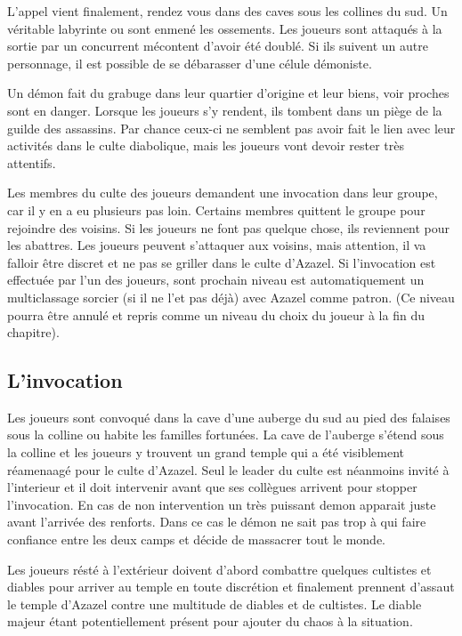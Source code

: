 L'appel vient finalement, rendez vous dans des caves sous les collines du sud.
Un véritable labyrinte ou sont enmené les ossements. Les joueurs sont attaqués
à la sortie par un concurrent mécontent d'avoir été doublé. Si ils suivent un 
autre personnage, il est possible de se débarasser d'une célule démoniste.

Un démon fait du grabuge dans leur quartier d'origine et 
leur biens, voir proches sont en danger. Lorsque les joueurs s'y rendent, ils tombent 
dans un piège de la guilde des assassins. Par chance ceux-ci ne semblent pas avoir 
fait le lien avec leur activités dans le culte diabolique, mais les joueurs vont
devoir rester très attentifs.

Les membres du culte des joueurs demandent une invocation dans leur groupe, car il y
en a eu plusieurs pas loin. Certains membres quittent le groupe pour rejoindre
des voisins. Si les joueurs ne font pas quelque chose, ils reviennent pour les
abattres. Les joueurs peuvent s'attaquer aux voisins, mais attention, il va falloir 
être discret et ne pas se griller dans le culte d'Azazel. Si l'invocation est 
effectuée par l'un des joueurs, sont prochain niveau est automatiquement un 
multiclassage sorcier (si il ne l'et pas déjà) avec Azazel comme patron. (Ce niveau 
pourra être annulé et repris comme un niveau du choix du joueur à la fin du chapitre).

\subsection*{L'invocation}

Les joueurs sont convoqué dans la cave d'une auberge du sud au pied des falaises 
sous la colline ou habite les familles fortunées. La cave de l'auberge s'étend 
sous la colline et les joueurs y trouvent un grand temple qui a été visiblement 
réamenaagé pour le culte d'Azazel. Seul le leader du culte est néanmoins invité à
l'interieur et il doit intervenir avant que ses collègues arrivent pour stopper 
l'invocation. En cas de non intervention un très puissant demon apparait juste 
avant l'arrivée des renforts. Dans ce cas le démon ne sait pas trop à qui faire 
confiance entre les deux camps et décide de massacrer tout le monde.

Les joueurs résté à l'extérieur doivent d'abord combattre quelques cultistes et diables 
pour arriver au temple en toute discrétion et finalement prennent d'assaut le
temple d'Azazel contre une multitude de diables et de cultistes. Le diable majeur étant 
potentiellement présent pour ajouter du chaos à la situation.

